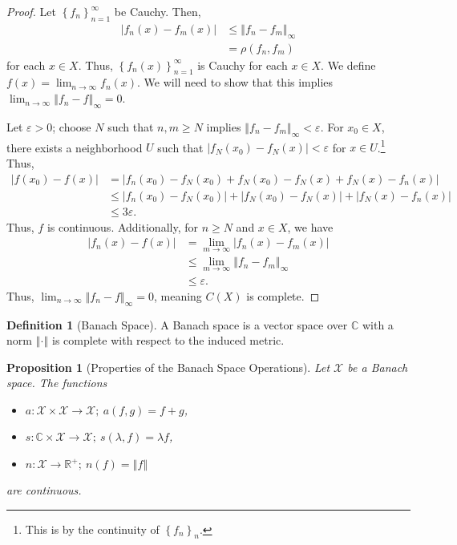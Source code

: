 \documentclass[10pt]{extarticle}
\newcommand{\R}{\mathbb{R}}
\newcommand{\C}{\mathbb{C}}
\newcommand{\norm}[1]{\left\Vert #1\right\Vert}
\newcommand{\set}[1]{\left\{#1\right\}}
\theoremstyle{plain}
\newtheorem*{proposition}{Proposition}
\theoremstyle{definition}
\newtheorem*{definition}{Definition}
\theoremstyle{note}
\renewcommand{\newline}{\hfill\break}
\begin{document}
\begin{proof}
  Let $\set{f_n}_{n=1}^{\infty}$ be Cauchy. Then,
  \begin{align*}
    \left\vert f_n(x) - f_m(x) \right\vert &\leq \norm{f_n - f_m}_{\infty}\\
    &= \rho(f_n,f_m)
  \end{align*}
  for each $x\in X$. Thus, $\set{f_n(x)}_{n=1}^{\infty}$ is Cauchy for each $x\in X$. We define $f(x) = \lim_{n\rightarrow \infty}f_n(x)$. We will need to show that this implies $\lim_{n\rightarrow\infty}\norm{f_n-f}_{\infty} = 0$.\newline

  Let $\varepsilon > 0$; choose $N$ such that $n,m \geq N$ implies $\norm{f_n - f_m}_{\infty} < \varepsilon$. For $x_0\in X$, there exists a neighborhood $U$ such that $\left\vert f_N(x_0) - f_N(x) \right\vert < \varepsilon$ for $x\in U$.\footnote{This is by the continuity of $\set{f_n}_n$.} Thus,
  \begin{align*}
    \left\vert f(x_0) - f(x) \right\vert &= \left\vert f_n(x_0) - f_N(x_0) + f_N(x_0) - f_N(x) + f_N(x) - f_n(x) \right\vert\\
                                         &\leq \left\vert f_n(x_0) - f_N(x_0) \right\vert + \left\vert f_N(x_0) - f_N(x) \right\vert + \left\vert f_N(x) - f_n(x) \right\vert\\
                                         &\leq 3\varepsilon.
  \end{align*}
  Thus, $f$ is continuous. Additionally, for $n\geq N$ and $x\in X$, we have
  \begin{align*}
    \left\vert f_n(x) - f(x) \right\vert &= \lim_{m\rightarrow\infty}\left\vert f_n(x) - f_m(x) \right\vert\\
                                         &\leq \lim_{m\rightarrow\infty}\norm{f_n-f_m}_{\infty}\\
                                         &\leq \varepsilon.
  \end{align*}
  Thus, $\lim_{n\rightarrow\infty}\norm{f_n - f}_{\infty} = 0$, meaning $C(X)$ is complete.
\end{proof}
\begin{definition}[Banach Space]
  A Banach space is a vector space over $\C$ with a norm $\norm{\cdot}$ is complete with respect to the induced metric.
\end{definition}
\begin{proposition}[Properties of the Banach Space Operations]
  Let $\mathcal{X}$ be a Banach space. The functions
  \begin{itemize}
    \item $a: \mathcal{X}\times \mathcal{X} \rightarrow \mathcal{X};\:a(f,g) = f+g$,
    \item $s: \C\times \mathcal{X}\rightarrow \mathcal{X};\:s(\lambda,f) = \lambda f$,
    \item $n: \mathcal{X}\rightarrow \R^{+};\:n(f) = \norm{f}$
  \end{itemize}
  are continuous.
\end{proposition}
\end{document}
